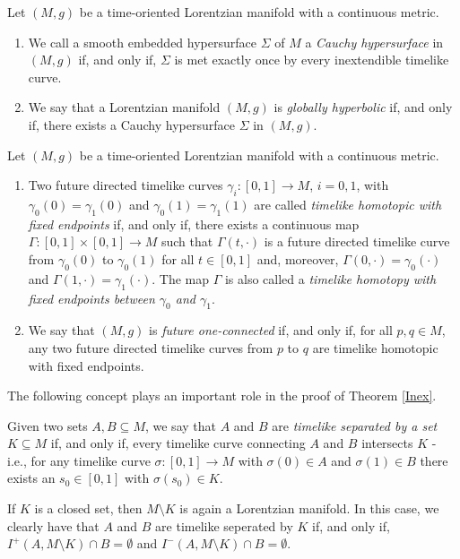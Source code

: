 \documentclass[reqno]{article}
\begin{document}
\begin{definition}\label{schwdef:cauchy_hypersurface} 
Let $(M,g)$ be a time-oriented Lorentzian manifold with a continuous metric. 
\begin{enumerate}
\item
We call a smooth embedded hypersurface $\Sigma$ of $M$ a \emph{Cauchy hypersurface} in $(M,g)$ if, and only if, $\Sigma$ is met exactly once by every inextendible timelike curve.
\item 
We say that a Lorentzian manifold $(M,g)$ is \emph{globally hyperbolic} if, and only if, there exists a Cauchy hypersurface $\Sigma$ in $(M,g)$.
\end{enumerate}
\end{definition}


\begin{definition}\label{schwdef:timelike_homotopic_fixed_endpoints}
Let $(M,g)$ be a time-oriented Lorentzian manifold with a continuous metric. 
\begin{enumerate}
\item Two future directed timelike curves $\gamma_i : [0,1] \to M$, $i = 0,1$, with $\gamma_0(0) = \gamma_1(0)$ and $\gamma_0(1) = \gamma_1(1)$ are called \emph{timelike homotopic with fixed endpoints} if, and only if, there exists a continuous map $\Gamma : [0,1] \times [0,1] \to M$ such that $\Gamma(t, \cdot)$ is a future directed timelike curve from $\gamma_0(0)$ to $\gamma_0(1)$ for all $t \in [0,1]$  and, moreover, $\Gamma(0, \cdot) = \gamma_0(\cdot)$ and $\Gamma(1,\cdot) = \gamma_1(\cdot)$. The map $\Gamma$ is also called a \emph{timelike homotopy with fixed endpoints between $\gamma_0$ and $\gamma_1$}.
\item We say that $(M,g)$ is \emph{future one-connected} if, and only if, for all $p, q \in M$, any two future directed timelike curves from $p$ to $q$ are timelike homotopic with fixed endpoints.
\end{enumerate}
\end{definition}

The following concept plays an important role in the proof of Theorem \ref{Inex}.

\begin{definition}\label{schwdef:timelike_separated_set}
Given two sets $A,B \subseteq M$, we say that $A$ and $B$ are \emph{timelike separated by a set $K \subseteq M$} if, and only if, every timelike curve connecting $A$ and $B$ intersects $K$ - i.e., for any timelike curve $\sigma : [0,1] \to M$ with $\sigma(0) \in A$ and $\sigma(1) \in B$ there exists an $s_0 \in [0,1]$ with $\sigma(s_0) \in K$.
\end{definition}
If $K$ is a closed set, then $M \setminus K$ is again a Lorentzian manifold. In this case, we clearly have that $A$ and $B$ are timelike seperated by $K$ if, and only if, $I^+(A,M\setminus K) \cap B = \emptyset$ and $I^-(A, M \setminus K) \cap B = \emptyset$.
\end{document}
